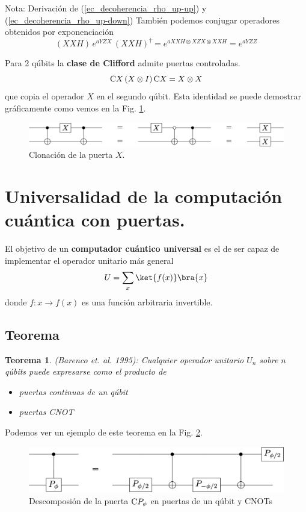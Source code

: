 \documentclass[a4paper,11pt]{book} %
\newtheorem{teorema_contador}{Teorema}
\newcommand{\Teorema}[1]{
		\begin{mybox_gray2}{}
			\begin{teorema_contador}
				 #1 
			\end{teorema_contador} 
		\end{mybox_gray2}
	}
\numberwithin{equation}{chapter}
\newcommand{\cg}[1]{{\rm C}#1}
\begin{document}
\begin{mybox_blue}{Nota: Derivación de (\ref{ec_decoherencia_rho_up-up}) y  (\ref{ec_decoherencia_rho_up-down})}
También podemos conjugar operadores obtenidos por exponenciación
	$$
	(XXH) \, e^{aYZX} \,  (XXH)^\dagger =e^{a XXH \otimes XZX \otimes XXH} =  e^{a YZZ}
	$$

Para 2 qúbits la \textbf{clase de Clifford} admite puertas controladas.
$$
\cg{X} \, (X\otimes I)\,  \cg{X} = X \otimes X
$$
que copia el operador $X$ en el segundo qúbit. Esta identidad se puede demostrar gráficamente como vemos en la Fig. \ref{Fig_elementos_clone_X}.
	\begin{figure}[H]
	\centering 
	\includegraphics[width=0.9\linewidth]{Figuras/Fig_elementos_clone_X}
	\caption{Clonación de la puerta $X$.}
	\label{Fig_elementos_clone_X}
	\end{figure}


	\section{Universalidad de la computación cuántica con puertas.} \label{sec_elementos_universalidad}

El objetivo de un \textbf{computador cuántico universal} es el de ser capaz de implementar el operador unitario más general
	$$
	U  = \sum_x \ket{f(x)}\bra{x}
	$$
donde $f: x \to f(x)$ es una función arbitraria invertible.

    	\subsection{Teorema}



	\Teorema{ (\textit{Barenco et. al. 1995}): 
	Cualquier operador unitario $U_n$ sobre $n$ qúbits puede expresarse como el 
	producto de 
	\begin{itemize}
		\item puertas continuas de \textit{un qúbit}
		\item puertas CNOT
	\end{itemize}
	}

Podemos ver un ejemplo de este teorema en la Fig. \ref{Fig_elementos_Equiv_Phase}.
	\begin{figure}[H]
	\centering 
	\includegraphics[width=0.60\linewidth]{Figuras/Fig_elementos_Equiv_Phase}
	\caption{Descomposión de la puerta $\cg{P_\phi}$ en puertas de un qúbit y CNOTs}
	\label{Fig_elementos_Equiv_Phase}
	\end{figure}


\end{mybox_blue}
\end{document}
